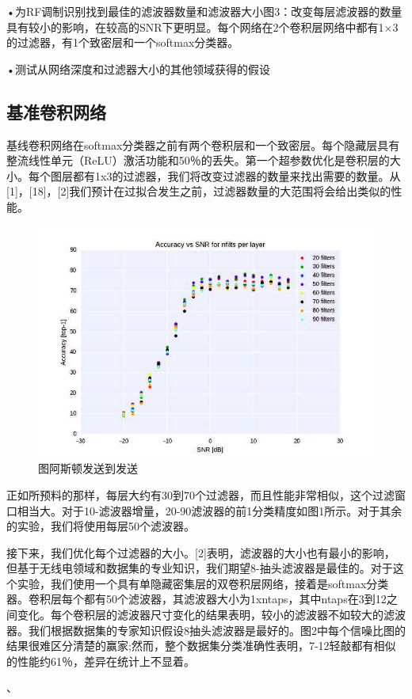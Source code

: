 •为RF调制识别找到最佳的滤波器数量和滤波器大小图3：改变每层滤波器的数量具有较小的影响，在较高的SNR下更明显。每个网络在2个卷积层网络中都有1×3的过滤器，有1个致密层和一个softmax分类器。\par

•测试从网络深度和过滤器大小的其他领域获得的假设\par

\subsection{基准卷积网络}

基线卷积网络在softmax分类器之前有两个卷积层和一个致密层。每个隐藏层具有整流线性单元（ReLU）激活功能和50％的丢失。第一个超参数优化是卷积层的大小。每个图层都有1x3的过滤器，我们将改变过滤器的数量来找出需要的数量。从[1]，[18]，[2]我们预计在过拟合发生之前，过滤器数量的大范围将会给出类似的性能。\par
\begin{figure}[!h]
	\centering
	\includegraphics[scale=1]{figures/chapter_5/fig1}
	\caption{图阿斯顿发送到发送}\label{fig_5_1}
\end{figure}
正如所预料的那样，每层大约有30到70个过滤器，而且性能非常相似，这个过滤窗口相当大。对于10-滤波器增量，20-90滤波器的前1分类精度如图1所示。对于其余的实验，我们将使用每层50个滤波器。\par

接下来，我们优化每个过滤器的大小。[2]表明，滤波器的大小也有最小的影响，但基于无线电领域和数据集的专业知识，我们期望8-抽头滤波器是最佳的。对于这个实验，我们使用一个具有单隐藏密集层的双卷积层网络，接着是softmax分类器。卷积层每个都有50个滤波器，其滤波器大小为1xntaps，其中ntaps在3到12之间变化。每个卷积层的滤波器尺寸变化的结果表明，较小的滤波器不如较大的滤波器。我们根据数据集的专家知识假设8抽头滤波器是最好的。图2中每个信噪比图的结果很难区分清楚的赢家;然而，整个数据集分类准确性表明，7-12轻敲都有相似的性能约61％，差异在统计上不显着。\par、

